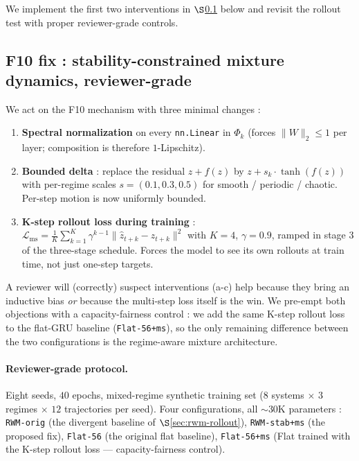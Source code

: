 \documentclass[11pt,a4paper]{article}
\begin{document}
We implement the first two interventions in $\S$\ref{sec:rwm-rollout-fix}
below and revisit the rollout test with proper reviewer-grade controls.

\subsection{F10 fix : stability-constrained mixture dynamics, reviewer-grade}
\label{sec:rwm-rollout-fix}

We act on the F10 mechanism with three minimal changes :

\begin{enumerate}[label=(\alph*),leftmargin=*]
\item \textbf{Spectral normalization} \cite{miyato2018spectralnorm} on
  every \texttt{nn.Linear} in $\Phi_k$ (forces $\|W\|_2 \leq 1$ per
  layer; composition is therefore $1$-Lipschitz).
\item \textbf{Bounded delta} : replace the residual $z + f(z)$ by
  $z + s_k \cdot \tanh(f(z))$ with per-regime scales
  $s = (0.1, 0.3, 0.5)$ for smooth / periodic / chaotic. Per-step
  motion is now uniformly bounded.
\item \textbf{K-step rollout loss during training} :
  $\mathcal{L}_{\text{ms}} = \frac{1}{K}\sum_{k=1}^{K}
  \gamma^{k-1} \|\hat z_{t+k} - z_{t+k}\|^2$ with $K{=}4$, $\gamma{=}0.9$,
  ramped in stage 3 of the three-stage schedule. Forces the model to
  see its own rollouts at train time, not just one-step targets.
\end{enumerate}

A reviewer will (correctly) suspect interventions (a-c) help because
they bring an inductive bias \emph{or} because the multi-step loss
itself is the win. We pre-empt both objections with a capacity-fairness
control : we add the same K-step rollout loss to the flat-GRU baseline
(\texttt{Flat-56+ms}), so the only remaining difference between the two
configurations is the regime-aware mixture architecture.

\paragraph{Reviewer-grade protocol.} Eight seeds, $40$ epochs, mixed-regime
synthetic training set ($8$ systems $\times$ $3$ regimes $\times$ $12$
trajectories per seed). Four configurations, all $\sim$30K parameters :
\texttt{RWM-orig} (the divergent baseline of $\S$\ref{sec:rwm-rollout}),
\texttt{RWM-stab+ms} (the proposed fix),
\texttt{Flat-56} (the original flat baseline),
\texttt{Flat-56+ms} (Flat trained with the K-step rollout loss ---
capacity-fairness control).
\end{document}
